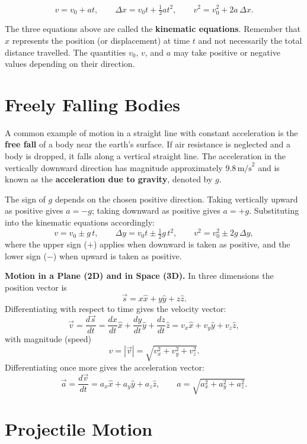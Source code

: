 \begin{keybox}
\[
  v = v_0 + at, \qquad
  \Delta x = v_0 t + \tfrac{1}{2}at^2, \qquad
  v^2 = v_0^2 + 2a\,\Delta x.
\]
\end{keybox}

The three equations above are called the \textbf{kinematic equations}. Remember that $x$
represents the position (or displacement) at time $t$ and not necessarily the total distance
travelled. The quantities $v_0$, $v$, and $a$ may take positive or negative values depending
on their direction.


\section{Freely Falling Bodies}

A common example of motion in a straight line with constant acceleration is the \textbf{free fall}
of a body near the earth's surface. If air resistance is neglected and a body is dropped, it
falls along a vertical straight line. The acceleration in the vertically downward direction has
magnitude approximately $9.8\,\text{m/s}^2$ and is known as the \textbf{acceleration due to
gravity}, denoted by $g$.

The sign of $g$ depends on the chosen positive direction. Taking vertically upward as
positive gives $a=-g$; taking downward as positive gives $a=+g$. Substituting into the
kinematic equations accordingly:
\[
  v = v_0 \pm g\,t, \qquad \Delta y = v_0 t \pm \tfrac{1}{2}g\,t^2, \qquad v^2 = v_0^2 \pm 2g\,\Delta y,
\]
where the upper sign ($+$) applies when downward is taken as positive, and the lower sign
($-$) when upward is taken as positive.

\textbf{Motion in a Plane (2D) and in Space (3D).}
In three dimensions the position vector is
\[
  \vec{s} = x\hat{x} + y\hat{y} + z\hat{z}.
\]
Differentiating with respect to time gives the velocity vector:
\[
  \vec{v} = \frac{d\vec{s}}{dt} = \frac{dx}{dt}\hat{x} + \frac{dy}{dt}\hat{y} + \frac{dz}{dt}\hat{z}
           = v_x\hat{x} + v_y\hat{y} + v_z\hat{z},
\]
with magnitude (speed)
\[
  v = |\vec{v}| = \sqrt{v_x^2+v_y^2+v_z^2}.
\]
Differentiating once more gives the acceleration vector:
\[
  \vec{a} = \frac{d\vec{v}}{dt} = a_x\hat{x} + a_y\hat{y} + a_z\hat{z}, \qquad
  a = \sqrt{a_x^2+a_y^2+a_z^2}.
\]


\section{Projectile Motion}

